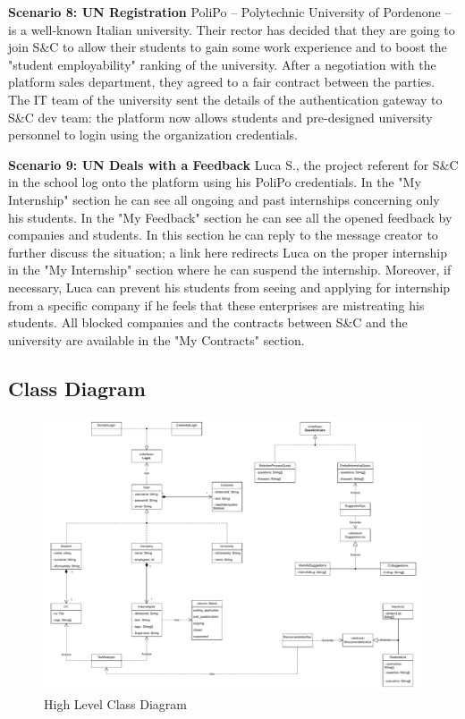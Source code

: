 \par{\textbf{Scenario 8: UN Registration}} PoliPo – Polytechnic University of Pordenone – is a well-known Italian
university. Their rector has decided that they are going to join S\&C to allow their students to gain some work
experience and to boost the "student employability" ranking of the university. After a negotiation with the platform
sales department, they agreed to a fair contract between the parties. The IT team of the university sent the details of
the authentication gateway to S\&C dev team: the platform now allows students and pre-designed university personnel to
login using the organization credentials.

\par{\textbf{Scenario 9: UN Deals with a Feedback}} Luca S., the project referent for S\&C in the school log onto the
platform using his PoliPo credentials. In the "My Internship" section he can see all ongoing and past internships
concerning only his students. In the "My Feedback" section he can see all the opened feedback by companies and
students. In this section he can reply to the message creator to further discuss the situation; a link here redirects
Luca on the proper internship in the "My Internship" section where he can suspend the internship.
Moreover, if necessary, Luca can prevent his students from seeing and applying for internship from a specific company
if he feels that these enterprises are mistreating his students. All blocked companies and the contracts between S\&C
and the university are available in the "My Contracts" section.

\subsection{Class Diagram}
\label{sub:class_diagram}%

\begin{figure}[H]
      \centering
      \includegraphics[width=1.0\textwidth]{Images/UML.pdf}
      \caption{High Level Class Diagram}
      \label{fig:class_diagram}
\end{figure}

